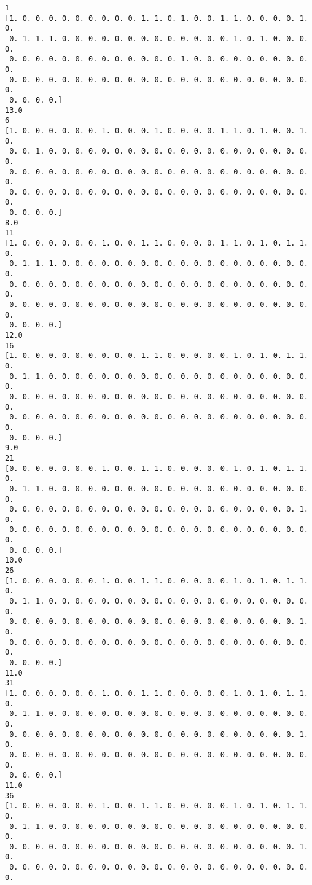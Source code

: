 \documentclass[11pt]{article}
\begin{document}
    \begin{Verbatim}[commandchars=\\\{\}]
1
[1. 0. 0. 0. 0. 0. 0. 0. 0. 0. 1. 1. 0. 1. 0. 0. 1. 1. 0. 0. 0. 0. 1. 0.
 0. 1. 1. 1. 0. 0. 0. 0. 0. 0. 0. 0. 0. 0. 0. 0. 0. 1. 0. 1. 0. 0. 0. 0.
 0. 0. 0. 0. 0. 0. 0. 0. 0. 0. 0. 0. 0. 1. 0. 0. 0. 0. 0. 0. 0. 0. 0. 0.
 0. 0. 0. 0. 0. 0. 0. 0. 0. 0. 0. 0. 0. 0. 0. 0. 0. 0. 0. 0. 0. 0. 0. 0.
 0. 0. 0. 0.]
13.0
6
[1. 0. 0. 0. 0. 0. 0. 1. 0. 0. 0. 1. 0. 0. 0. 0. 1. 1. 0. 1. 0. 0. 1. 0.
 0. 0. 1. 0. 0. 0. 0. 0. 0. 0. 0. 0. 0. 0. 0. 0. 0. 0. 0. 0. 0. 0. 0. 0.
 0. 0. 0. 0. 0. 0. 0. 0. 0. 0. 0. 0. 0. 0. 0. 0. 0. 0. 0. 0. 0. 0. 0. 0.
 0. 0. 0. 0. 0. 0. 0. 0. 0. 0. 0. 0. 0. 0. 0. 0. 0. 0. 0. 0. 0. 0. 0. 0.
 0. 0. 0. 0.]
8.0
11
[1. 0. 0. 0. 0. 0. 0. 1. 0. 0. 1. 1. 0. 0. 0. 0. 1. 1. 0. 1. 0. 1. 1. 0.
 0. 1. 1. 1. 0. 0. 0. 0. 0. 0. 0. 0. 0. 0. 0. 0. 0. 0. 0. 0. 0. 0. 0. 0.
 0. 0. 0. 0. 0. 0. 0. 0. 0. 0. 0. 0. 0. 0. 0. 0. 0. 0. 0. 0. 0. 0. 0. 0.
 0. 0. 0. 0. 0. 0. 0. 0. 0. 0. 0. 0. 0. 0. 0. 0. 0. 0. 0. 0. 0. 0. 0. 0.
 0. 0. 0. 0.]
12.0
16
[1. 0. 0. 0. 0. 0. 0. 0. 0. 0. 1. 1. 0. 0. 0. 0. 0. 1. 0. 1. 0. 1. 1. 0.
 0. 1. 1. 0. 0. 0. 0. 0. 0. 0. 0. 0. 0. 0. 0. 0. 0. 0. 0. 0. 0. 0. 0. 0.
 0. 0. 0. 0. 0. 0. 0. 0. 0. 0. 0. 0. 0. 0. 0. 0. 0. 0. 0. 0. 0. 0. 0. 0.
 0. 0. 0. 0. 0. 0. 0. 0. 0. 0. 0. 0. 0. 0. 0. 0. 0. 0. 0. 0. 0. 0. 0. 0.
 0. 0. 0. 0.]
9.0
21
[0. 0. 0. 0. 0. 0. 0. 1. 0. 0. 1. 1. 0. 0. 0. 0. 0. 1. 0. 1. 0. 1. 1. 0.
 0. 1. 1. 0. 0. 0. 0. 0. 0. 0. 0. 0. 0. 0. 0. 0. 0. 0. 0. 0. 0. 0. 0. 0.
 0. 0. 0. 0. 0. 0. 0. 0. 0. 0. 0. 0. 0. 0. 0. 0. 0. 0. 0. 0. 0. 0. 1. 0.
 0. 0. 0. 0. 0. 0. 0. 0. 0. 0. 0. 0. 0. 0. 0. 0. 0. 0. 0. 0. 0. 0. 0. 0.
 0. 0. 0. 0.]
10.0
26
[1. 0. 0. 0. 0. 0. 0. 1. 0. 0. 1. 1. 0. 0. 0. 0. 0. 1. 0. 1. 0. 1. 1. 0.
 0. 1. 1. 0. 0. 0. 0. 0. 0. 0. 0. 0. 0. 0. 0. 0. 0. 0. 0. 0. 0. 0. 0. 0.
 0. 0. 0. 0. 0. 0. 0. 0. 0. 0. 0. 0. 0. 0. 0. 0. 0. 0. 0. 0. 0. 0. 1. 0.
 0. 0. 0. 0. 0. 0. 0. 0. 0. 0. 0. 0. 0. 0. 0. 0. 0. 0. 0. 0. 0. 0. 0. 0.
 0. 0. 0. 0.]
11.0
31
[1. 0. 0. 0. 0. 0. 0. 1. 0. 0. 1. 1. 0. 0. 0. 0. 0. 1. 0. 1. 0. 1. 1. 0.
 0. 1. 1. 0. 0. 0. 0. 0. 0. 0. 0. 0. 0. 0. 0. 0. 0. 0. 0. 0. 0. 0. 0. 0.
 0. 0. 0. 0. 0. 0. 0. 0. 0. 0. 0. 0. 0. 0. 0. 0. 0. 0. 0. 0. 0. 0. 1. 0.
 0. 0. 0. 0. 0. 0. 0. 0. 0. 0. 0. 0. 0. 0. 0. 0. 0. 0. 0. 0. 0. 0. 0. 0.
 0. 0. 0. 0.]
11.0
36
[1. 0. 0. 0. 0. 0. 0. 1. 0. 0. 1. 1. 0. 0. 0. 0. 0. 1. 0. 1. 0. 1. 1. 0.
 0. 1. 1. 0. 0. 0. 0. 0. 0. 0. 0. 0. 0. 0. 0. 0. 0. 0. 0. 0. 0. 0. 0. 0.
 0. 0. 0. 0. 0. 0. 0. 0. 0. 0. 0. 0. 0. 0. 0. 0. 0. 0. 0. 0. 0. 0. 1. 0.
 0. 0. 0. 0. 0. 0. 0. 0. 0. 0. 0. 0. 0. 0. 0. 0. 0. 0. 0. 0. 0. 0. 0. 0.

\end{Verbatim}
\end{document}
